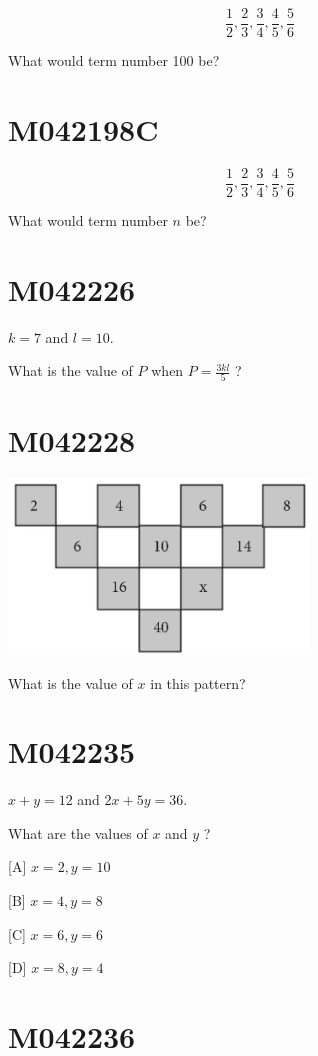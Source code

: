 \documentclass[12pt]{article}
\begin{document}
$$
\frac{1}{2}, \frac{2}{3}, \frac{3}{4}, \frac{4}{5}, \frac{5}{6}
$$

What would term number 100 be?

\newpage
\section*{M042198C}

$$
\frac{1}{2}, \frac{2}{3}, \frac{3}{4}, \frac{4}{5}, \frac{5}{6}
$$

What would term number $n$ be?

\newpage
\section*{M042226}

$k=7$ and $l=10$.

What is the value of $P$ when $P=\frac{3 k l}{5}$ ?

\newpage
\section*{M042228}


\includegraphics[max width=0.6\textwidth]{2024_02_20_828ebc9d68bcc1fbb223g-44}


What is the value of $x$ in this pattern?

\newpage
\section*{M042235}

$x+y=12$ and $2 x+5 y=36$.

What are the values of $x$ and $y$ ?

[A] $x=2, y=10$

[B] $x=4, y=8$

[C] $x=6, y=6$

[D] $x=8, y=4$

\newpage
\section*{M042236}
\end{document}
